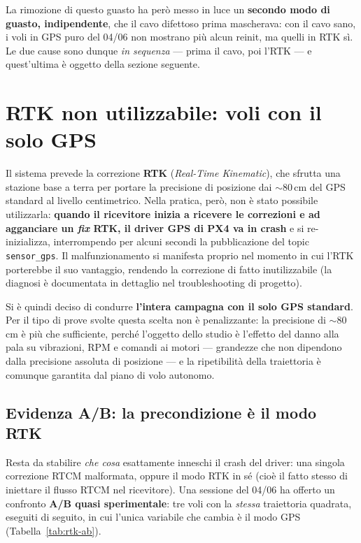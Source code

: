 La rimozione di questo guasto ha per\`o messo in luce un \textbf{secondo modo di
guasto, indipendente}, che il cavo difettoso prima mascherava: con il cavo sano, i
voli in GPS puro del 04/06 non mostrano pi\`u alcun reinit, ma quelli in RTK
s\`i. Le due cause sono dunque \emph{in sequenza} --- prima il cavo, poi l'RTK ---
e quest'ultima \`e oggetto della sezione seguente.


\section{RTK non utilizzabile: voli con il solo GPS}

Il sistema prevede la correzione \textbf{RTK} (\emph{Real-Time Kinematic}), che
sfrutta una stazione base a terra per portare la precisione di posizione dai
$\sim$80\,cm del GPS standard al livello centimetrico. Nella pratica, per\`o, non
\`e stato possibile utilizzarla: \textbf{quando il ricevitore inizia a ricevere le
correzioni e ad agganciare un \emph{fix} RTK, il driver GPS di PX4 va in crash} e
si re-inizializza, interrompendo per alcuni secondi la pubblicazione del topic
\texttt{sensor\_gps}. Il malfunzionamento si manifesta proprio nel momento in cui
l'RTK porterebbe il suo vantaggio, rendendo la correzione di fatto inutilizzabile
(la diagnosi \`e documentata in dettaglio nel troubleshooting di progetto).

Si \`e quindi deciso di condurre \textbf{l'intera campagna con il solo GPS
standard}. Per il tipo di prove svolte questa scelta non \`e penalizzante: la
precisione di $\sim$80\,cm \`e pi\`u che sufficiente, perch\'e l'oggetto dello
studio \`e l'effetto del danno alla pala su vibrazioni, RPM e comandi ai motori ---
grandezze che non dipendono dalla precisione assoluta di posizione --- e la
ripetibilit\`a della traiettoria \`e comunque garantita dal piano di volo
autonomo.

\subsection{Evidenza A/B: la precondizione \`e il modo RTK}

Resta da stabilire \emph{che cosa} esattamente inneschi il crash del driver:
una singola correzione RTCM malformata, oppure il modo RTK in s\'e (cio\`e il
fatto stesso di iniettare il flusso RTCM nel ricevitore). Una sessione del 04/06
ha offerto un confronto \textbf{A/B quasi sperimentale}: tre voli con la
\emph{stessa} traiettoria quadrata, eseguiti di seguito, in cui l'unica variabile
che cambia \`e il modo GPS (Tabella~\ref{tab:rtk-ab}).

